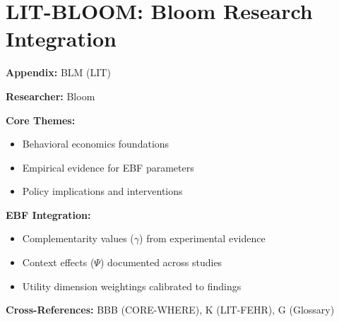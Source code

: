 %
%

\chapter{LIT-BLOOM: Bloom Research Integration}
\label{app:blm}

\begin{abstract}
This appendix integrates the research contributions of Bloom into the
Evidence-Based Framework. It documents key papers, core findings, and their
integration with EBF dimensions including complementarity parameters ($\gamma$),
context factors ($\Psi$), and utility dimensions.
\end{abstract}

\begin{tcolorbox}[colback=blue!5!white, colframe=blue!75!black,
    title=Quick Reference: Bloom Research]

\textbf{Appendix:} BLM (LIT)

\textbf{Researcher:} Bloom

\textbf{Core Themes:}
\begin{itemize}[nosep]
\item Behavioral economics foundations
\item Empirical evidence for EBF parameters
\item Policy implications and interventions
\end{itemize}

\textbf{EBF Integration:}
\begin{itemize}[nosep]
\item Complementarity values ($\gamma$) from experimental evidence
\item Context effects ($\Psi$) documented across studies
\item Utility dimension weightings calibrated to findings
\end{itemize}

\textbf{Cross-References:} BBB (CORE-WHERE), K (LIT-FEHR), G (Glossary)
\end{tcolorbox}

